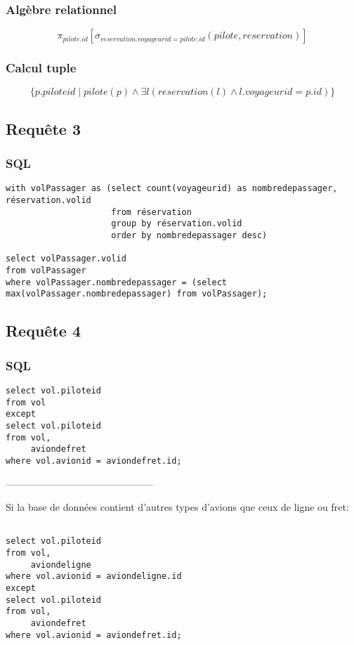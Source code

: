 \documentclass[french, utf8]{article}
\begin{document}
\subsubsection{Algèbre relationnel}
\[ \pi_{pilote.id}[\sigma_{reservation.voyageurid=pilote.id}(pilote, reservation)]\]
\subsubsection{Calcul tuple}
\[\{p.piloteid\; | \;pilote(p) \wedge \exists l(reservation(l) \wedge l.voyageurid=p.id )\}\]
\newpage
\subsection{Requête 3}
\subsubsection{SQL}
\begin{verbatim}
with volPassager as (select count(voyageurid) as nombredepassager, réservation.volid
                     from réservation
                     group by réservation.volid
                     order by nombredepassager desc)

select volPassager.volid
from volPassager
where volPassager.nombredepassager = (select max(volPassager.nombredepassager) from volPassager);
\end{verbatim}
\newpage

\subsection{Requête 4}
\subsubsection{SQL}
\begin{lstlisting}
select vol.piloteid
from vol
except
select vol.piloteid
from vol,
     aviondefret
where vol.avionid = aviondefret.id;

\end{lstlisting}

---------------------------------------------

Si la base de données contient d'autres types d'avions que ceux de ligne ou fret:

\begin{lstlisting}

select vol.piloteid
from vol,
     aviondeligne
where vol.avionid = aviondeligne.id
except
select vol.piloteid
from vol,
     aviondefret
where vol.avionid = aviondefret.id;

\end{lstlisting}
\end{document}
